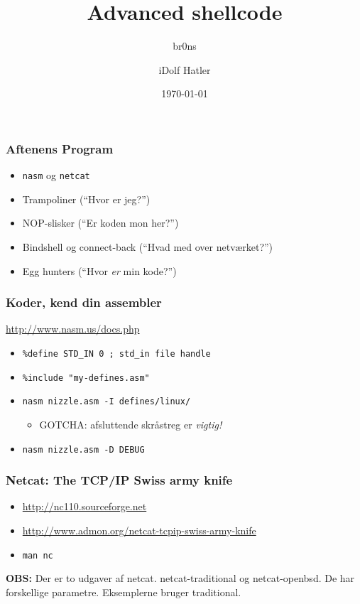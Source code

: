 \documentclass[slidestop,compress,mathserif, xcolor=table]{beamer}
\title[]{Advanced shellcode}
\author[br0ns \and iDolf Hatler]
       {br0ns \and iDolf Hatler}
\institute[DIKU]{Datalogisk institut, Københavns universitet}
\date[]{\today}
\begin{document}
\frame[plain]{\titlepage}

\begin{frame}[c]
    \frametitle{Aftenens Program}

    \begin{itemize}
      \pause
        \item \texttt{nasm} og \texttt{netcat}
      \pause
        \item Trampoliner (``Hvor er jeg?'')
      \pause
        \item NOP-slisker (``Er koden mon her?'')
      \pause
        \item Bindshell og connect-back (``Hvad med over netværket?'')
      \pause
        \item Egg hunters (``Hvor \emph{er} min kode?'')
    \end{itemize}
\end{frame}

\begin{frame}[c]
    \frametitle{Koder, kend din assembler}
    \url{http://www.nasm.us/docs.php} \\

    \begin{itemize}
        \pause\item \texttt{\%define STD\_IN 0 ; std\_in file handle}
        \pause\item \texttt{\%include "my-defines.asm"}
        \pause\item \texttt{nasm nizzle.asm -I defines/linux/}
        \pause
          \begin{itemize}
          \item GOTCHA: afsluttende skråstreg er \textit{vigtig!}
          \end{itemize}
        \pause\item \texttt{nasm nizzle.asm -D DEBUG}
        \pause
    \end{itemize}
\end{frame}

\begin{frame}[c]
    \frametitle{Netcat: The TCP/IP Swiss army knife}
    \begin{itemize}
      \item \url{http://nc110.sourceforge.net}
      \item \url{http://www.admon.org/netcat-tcpip-swiss-army-knife}
      \item \texttt{man nc}
    \end{itemize}

    \pause \textbf{OBS:} Der er to udgaver af netcat. netcat-traditional og
    netcat-openbsd. De har forskellige parametre. Eksemplerne bruger
    traditional.
\end{frame}
\end{document}
